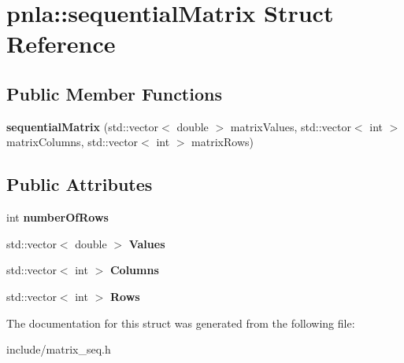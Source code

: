 \hypertarget{structpnla_1_1sequentialMatrix}{}\section{pnla\+:\+:sequential\+Matrix Struct Reference}
\label{structpnla_1_1sequentialMatrix}
\subsection*{Public Member Functions}
\begin{DoxyCompactItemize}
\item 
\mbox{\label{structpnla_1_1sequentialMatrix_ab2054228ab3de2a9f057abeef31682ac}} 
{\bfseries sequential\+Matrix} (std\+::vector$<$ double $>$ matrix\+Values, std\+::vector$<$ int $>$ matrix\+Columns, std\+::vector$<$ int $>$ matrix\+Rows)
\end{DoxyCompactItemize}
\subsection*{Public Attributes}
\begin{DoxyCompactItemize}
\item 
\mbox{\label{structpnla_1_1sequentialMatrix_a23a754a433b9c98defd6eabbdc41fe4f}} 
int {\bfseries number\+Of\+Rows}
\item 
\mbox{\label{structpnla_1_1sequentialMatrix_aba66887c61db2c73a2d05f71319bbe65}} 
std\+::vector$<$ double $>$ {\bfseries Values}
\item 
\mbox{\label{structpnla_1_1sequentialMatrix_a0a6c5dd507b2ce01e29b312f1ccce12f}} 
std\+::vector$<$ int $>$ {\bfseries Columns}
\item 
\mbox{\label{structpnla_1_1sequentialMatrix_a89e0a283309f43765903b27b7a48247c}} 
std\+::vector$<$ int $>$ {\bfseries Rows}
\end{DoxyCompactItemize}


The documentation for this struct was generated from the following file\+:\begin{DoxyCompactItemize}
\item 
include/matrix\+\_\+seq.\+h\end{DoxyCompactItemize}
